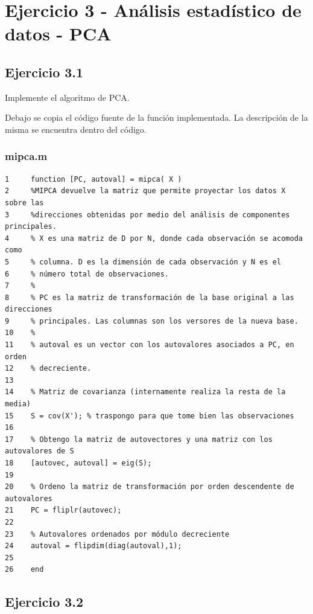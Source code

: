 \documentclass[11pt,a4paper,final]{article}
\begin{document}
\clearpage







\section{Ejercicio 3 - Análisis estadístico de datos - PCA}

\subsection{Ejercicio 3.1}


Implemente el algoritmo de PCA.


Debajo se copia el código fuente de la función implementada. La descripción de la misma se encuentra dentro del código.

\subsubsection*{mipca.m}

\begin{verbatim}
1     function [PC, autoval] = mipca( X )
2     %MIPCA devuelve la matriz que permite proyectar los datos X sobre las
3     %direcciones obtenidas por medio del análisis de componentes principales.
4     % X es una matriz de D por N, donde cada observación se acomoda como
5     % columna. D es la dimensión de cada observación y N es el
6     % número total de observaciones.
7     %
8     % PC es la matriz de transformación de la base original a las direcciones
9     % principales. Las columnas son los versores de la nueva base.
10    %
11    % autoval es un vector con los autovalores asociados a PC, en orden 
12    % decreciente.
13    
14    % Matriz de covarianza (internamente realiza la resta de la media)
15    S = cov(X'); % traspongo para que tome bien las observaciones
16    
17    % Obtengo la matriz de autovectores y una matriz con los autovalores de S
18    [autovec, autoval] = eig(S);
19    
20    % Ordeno la matriz de transformación por orden descendente de autovalores
21    PC = fliplr(autovec);
22    
23    % Autovalores ordenados por módulo decreciente
24    autoval = flipdim(diag(autoval),1);
25    
26    end
\end{verbatim}
    

\subsection{Ejercicio 3.2}
\end{document}
